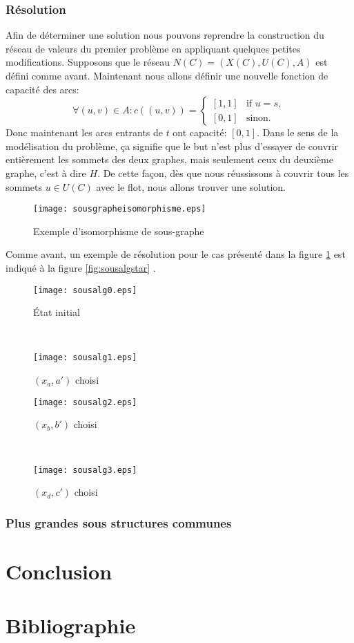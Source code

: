 \documentclass[french]{article}
\theoremstyle{definition}
\theoremstyle{remark}
\begin{document}
\subsubsection{Résolution}
Afin de déterminer une solution nous pouvons reprendre la construction du réseau de valeurs du premier problème en appliquant quelques petites modifications. Supposons que le réseau $N(C)=(X(C), U(C), A)$ est défini comme avant. Maintenant nous allons définir une nouvelle fonction de capacité des arcs:
\[  \forall (u,v) \in A:
c((u,v))= 
\begin{cases}
[1,1]& \text{if } u=s,\\
[0,1]              & \text{sinon}.
\end{cases}
\]
Donc maintenant les arcs entrants de $t$ ont capacité: $[0,1]$. Dans le sens de la modélisation du problème, ça signifie que le but n'est plus d'essayer de couvrir entièrement les sommets des deux graphes, mais seulement ceux du deuxième graphe, c'est à dire $H$. De cette façon, dès que nous réussissons à couvrir tous les sommets $u \in U(C)$ avec le flot, nous allons trouver une solution. 
\begin{figure}[t]
	\centering
	\texttt{[image: sousgrapheisomorphisme.eps]}
	\caption{\label{fig:isosubgraph}Exemple d'isomorphisme de sous-graphe}
\end{figure}
Comme avant, un exemple de résolution pour le cas présenté dans la figure \ref{fig:isosubgraph} est indiqué à la figure \ref{fig:sousalgstar} .



\begin{figure*}[t!]
	\begin{subfigure}[t]{0.5\textwidth}
		\centering
		\texttt{[image: sousalg0.eps]}
		\caption{État initial}
	\end{subfigure}%
	~
	\begin{subfigure}[t]{0.5\textwidth}
		\centering
		\texttt{[image: sousalg1.eps]}
		\caption{$(x_a, a')$ choisi}
	\end{subfigure}
	
	\begin{subfigure}[t]{0.5\textwidth}
		\centering
		\texttt{[image: sousalg2.eps]}
		\caption{$(x_b, b')$ choisi}
	\end{subfigure}
	~
	\begin{subfigure}[t]{0.5\textwidth}
		\centering
		\texttt{[image: sousalg3.eps]}
		\caption{$(x_d, c')$ choisi}
	\end{subfigure}
	
	\caption{\label{fig:sousalgstar} Résolution pour l'exemple dans la figure \ref{fig:isosubgraph}.}
\end{figure*}

\newpage
\subsubsection{Plus grandes sous structures communes}

\newpage
\section{Conclusion}


\newpage
\section{Bibliographie}
\end{document}
